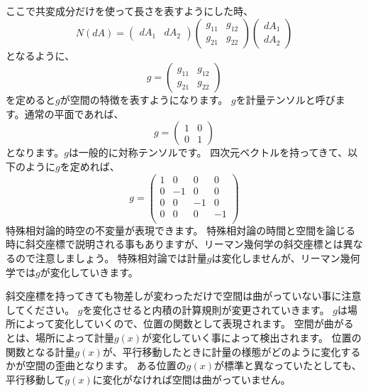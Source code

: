 \documentclass[a4paper,12pt,notitlepage]{jsreport}
\begin{document}
ここで共変成分だけを使って長さを表すようにした時、
\begin{equation}
  N(dA)=
  \begin{pmatrix}
    dA_1&dA_2
  \end{pmatrix}
  \begin{pmatrix}
    g_{11}&g_{12}\\g_{21}&g_{22}
  \end{pmatrix}
  \begin{pmatrix}
    dA_1\\dA_2
  \end{pmatrix}
\end{equation}
となるように、
\begin{equation}
  g =
  \begin{pmatrix}
    g_{11}&g_{12}\\g_{21}&g_{22}
  \end{pmatrix}
\end{equation}
を定めると$ g $が空間の特徴を表すようになります。
$ g $を計量テンソルと呼びます。通常の平面であれば、
\begin{equation}
  g =
  \begin{pmatrix}
    1&0\\0&1
  \end{pmatrix}
\end{equation}
となります。$g$は一般的に対称テンソルです。
四次元ベクトルを持ってきて、以下のように$g$を定めれば、
\begin{equation}
  g =
  \begin{pmatrix}
    1&0&0&0\\
    0&-1&0&0\\
    0&0&-1&0\\
    0&0&0&-1\\
  \end{pmatrix}
\end{equation}
特殊相対論的時空の不変量が表現できます。
特殊相対論の時間と空間を論じる時に斜交座標で説明される事もありますが、リーマン幾何学の斜交座標とは異なるので注意しましょう。
特殊相対論では計量$ g $は変化しませんが、リーマン幾何学では$ g $が変化していきます。

斜交座標を持ってきても物差しが変わっただけで空間は曲がっていない事に注意してください。
$ g $を変化させると内積の計算規則が変更されていきます。
$ g $は場所によって変化していくので、位置の関数として表現されます。
空間が曲がるとは、場所によって計量$ g(x) $が変化していく事によって検出されます。
位置の関数となる計量$ g(x) $が、平行移動したときに計量の様態がどのように変化するかが空間の歪曲となります。
ある位置の$ g(x) $が標準と異なっていたとしても、平行移動して$ g(x) $に変化がなければ空間は曲がっていません。
\end{document}
